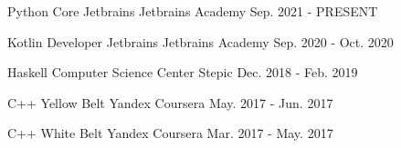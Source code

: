 
\begin{cventries}

  \cventry
    {Python Core}
    {Jetbrains}
    {Jetbrains Academy}
    {Sep. 2021 - PRESENT}
    {}

  \cventry
    {Kotlin Developer}
    {Jetbrains}
    {Jetbrains Academy}
    {Sep. 2020 - Oct. 2020}
    {}

  \cventry
    {Haskell}
    {Computer Science Center}
    {Stepic}
    {Dec. 2018 - Feb. 2019}
    {}

  \cventry
    {C++ Yellow Belt}
    {Yandex}
    {Coursera}
    {May. 2017 - Jun. 2017}
    {}

  \cventry
    {C++ White Belt}
    {Yandex}
    {Coursera}
    {Mar. 2017 - May. 2017}
    {}

\end{cventries}
